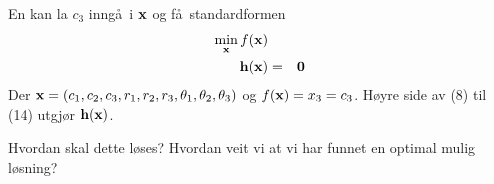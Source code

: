 En kan la  
$c_{3}$ inng\aa\ i ${\bf x}$ 
og f\aa\ standardformen 
\begin{eqnarray} 
\min_{{\bf x}} f({\bf x}) \\ 
{\bf h (x)} & = & {\bf 0} 
\end{eqnarray} 
Der ${\bf x} = (c_{1},c_{2},c_{3},r_{1},r_{2},r_{3},\theta_{1},\theta_{2},\theta_{3})$ og 
$f({\bf x}) = x_{3} = c_{3}$.  H\o yre side av (8) til (14) utgj\o r 
${\bf h (x)}$. 
 
Hvordan skal dette l\o ses?  Hvordan veit vi at vi har funnet en 
optimal mulig l\o sning? 
 


